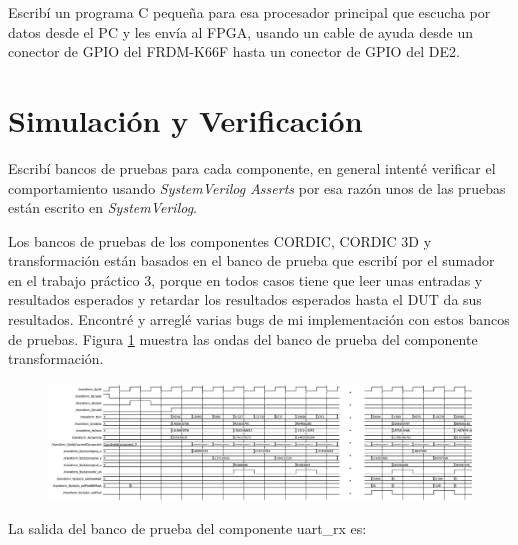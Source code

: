 \documentclass[a4paper]{article}
\begin{document}
Escribí un programa C pequeña para esa procesador principal que escucha por datos desde el PC y les envía al FPGA, usando un cable de ayuda desde un conector de GPIO del FRDM-K66F hasta un conector de GPIO del DE2.

\section{Simulación y Verificación}

Escribí bancos de pruebas para cada componente, en general intenté verificar el comportamiento usando \textit{SystemVerilog Asserts} por esa razón unos de las pruebas están escrito en \textit{SystemVerilog}.

Los bancos de pruebas de los componentes CORDIC, CORDIC 3D y transformación están basados en el banco de prueba que escribí por el sumador en el trabajo práctico 3, porque en todos casos tiene que leer unas entradas y resultados esperados y retardar los resultados esperados hasta el DUT da sus resultados. Encontré y arreglé varias bugs de mi implementación con estos bancos de pruebas. Figura \ref{fig:transform_waves} muestra las ondas del banco de prueba del componente transformación.

\begin{figure}[!h]
\includegraphics[width=15cm]{img/transform_waves.png}
\label{fig:transform_waves}
\end{figure}

\newpage
La salida del banco de prueba del componente uart\_rx es:
\end{document}

